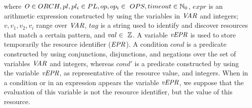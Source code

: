 \indent where ${\mathit O \in ORCH, pl,pl_{i} \in PL, op,op_{i} \in \ OPS, timeout \in \mathbb{N}_{0}}$, ${\mathit  expr}$ is an arithmetic expression constructed by using the variables in ${\it VAR}$ and integers; ${\mathit v,v_1,v_2,v_i}$ range over ${\it VAR}$, ${\mathit tag}$ is a string used to identify and discover resources that match a certain pattern, and ${\mathit val \in\ \entero}$. A variable ${\it vEPR}$ is used to store temporarily the resource identifier (${\it EPR}$). A condition ${\mathit cond}$ is a predicate constructed by using conjunctions, disjunctions, and negations over the set of variables ${\it VAR}$ and integers, whereas ${\mathit cond'}$ is a predicate constructed by using the variable ${\it vEPR}$, as representative of the resource value, and integers. When in a condition or in an expression appears the variable ${\it vEPR}$, we suppose that the evaluation of this variable is not the resource identifier, but the value of this resource.


